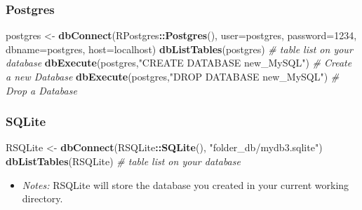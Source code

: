 \documentclass[
]{book}
\newenvironment{Shaded}{\begin{snugshade}}{\end{snugshade}}
\newcommand{\AttributeTok}[1]{\textcolor[rgb]{0.13,0.29,0.53}{#1}}
\newcommand{\CommentTok}[1]{\textcolor[rgb]{0.56,0.35,0.01}{\textit{#1}}}
\newcommand{\FunctionTok}[1]{\textcolor[rgb]{0.13,0.29,0.53}{\textbf{#1}}}
\newcommand{\NormalTok}[1]{#1}
\newcommand{\OtherTok}[1]{\textcolor[rgb]{0.56,0.35,0.01}{#1}}
\newcommand{\SpecialCharTok}[1]{\textcolor[rgb]{0.81,0.36,0.00}{\textbf{#1}}}
\newcommand{\StringTok}[1]{\textcolor[rgb]{0.31,0.60,0.02}{#1}}
\providecommand{\tightlist}{%
  \setlength{\itemsep}{0pt}\setlength{\parskip}{0pt}}
\begin{document}
\hypertarget{postgres}{%
\subsubsection*{Postgres}\label{postgres}}

\begin{Shaded}
\begin{Highlighting}[]
\NormalTok{postgres }\OtherTok{\textless{}{-}} \FunctionTok{dbConnect}\NormalTok{(RPostgres}\SpecialCharTok{::}\FunctionTok{Postgres}\NormalTok{(), }
                  \AttributeTok{user=}\StringTok{\textquotesingle{}postgres\textquotesingle{}}\NormalTok{,}
                  \AttributeTok{password=}\StringTok{\textquotesingle{}1234\textquotesingle{}}\NormalTok{, }
                  \AttributeTok{dbname=}\StringTok{\textquotesingle{}postgres\textquotesingle{}}\NormalTok{, }
                  \AttributeTok{host=}\StringTok{\textquotesingle{}localhost\textquotesingle{}}\NormalTok{)}
\FunctionTok{dbListTables}\NormalTok{(postgres)                               }\CommentTok{\# table list on your database}
\FunctionTok{dbExecute}\NormalTok{(postgres,}\StringTok{"CREATE DATABASE new\_MySQL"}\NormalTok{)      }\CommentTok{\# Create a new Database}
\FunctionTok{dbExecute}\NormalTok{(postgres,}\StringTok{"DROP DATABASE new\_MySQL"}\NormalTok{)        }\CommentTok{\# Drop a Database}
\end{Highlighting}
\end{Shaded}

\hypertarget{sqlite}{%
\subsubsection*{SQLite}\label{sqlite}}

\begin{Shaded}
\begin{Highlighting}[]
\NormalTok{RSQLite }\OtherTok{\textless{}{-}} \FunctionTok{dbConnect}\NormalTok{(RSQLite}\SpecialCharTok{::}\FunctionTok{SQLite}\NormalTok{(), }\StringTok{"folder\_db/mydb3.sqlite"}\NormalTok{)}
\FunctionTok{dbListTables}\NormalTok{(RSQLite)                             }\CommentTok{\# table list on your database}
\end{Highlighting}
\end{Shaded}

\begin{itemize}
\tightlist
\item
  \emph{Notes:} RSQLite will store the database you created in your current working directory.
\end{itemize}
\end{document}
